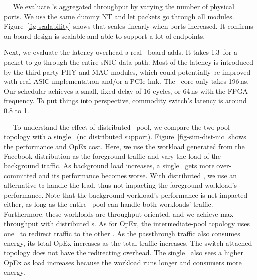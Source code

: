 ~~
We evaluate \snic{}'s aggregated throughput by varying the number of physical ports. We use the same dummy NT and let packets go through all modules.
Figure~\ref{fig-scalability} shows that \snic{} scales linearly when ports increased. It confirms \snic{} on-board design is scalable and able to support a lot of endpoints.
\fi

Next, we evaluate the latency overhead a real \snic\ board adds.  
It takes 1.3\mus\ for a packet to go through the entire sNIC data path. %
Most of the latency is introduced by the third-party PHY and MAC modules, which could potentially be improved with real ASIC implementation and/or a PCIe link. 
The \snic\ core only takes 196\,ns.
Our scheduler achieves a small, fixed delay of 16 cycles, or 64\,ns with the FPGA frequency. 
To put things into perspective, commodity switch's latency is around 0.8 to 1\mus.  



~~
To understand the effect of distributed \snic\ pool, we compare the two pool topology with a single \snic\ (no distributed support).
Figure~\ref{fig-sim-dist-nic} shows the performance and OpEx cost.
Here, we use the workload generated from the Facebook distribution as the foreground traffic and vary the load of the background traffic.
As background load increases, a single \snic\ gets more over-committed and its performance becomes worse.
With distributed \snic, we use an alternative \snic{} to handle the load, thus not impacting the foreground workload's performance. Note that the background workload's performance is not impacted either, as long as the entire \snic\ pool can handle both workloads' traffic. Furthermore, these workloads are throughput oriented, and we achieve max throughput with distributed \snic{}s.
As for OpEx, the intermediate-pool topology uses one \snic\ to redirect traffic to the other \snic.
As the passthrough traffic also consumes energy, its total OpEx increases as the total traffic increases.
The switch-attached topology does not have the redirecting overhead.
The single \snic\ also sees a higher OpEx as load increases because the workload runs longer and consumers more energy.

